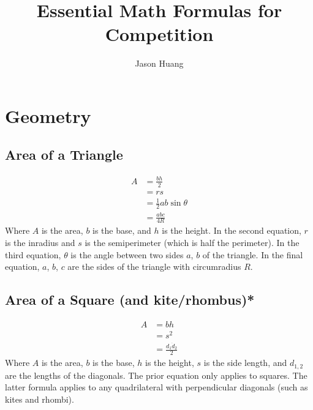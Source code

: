 \documentclass[]{scrartcl}
\title{Essential Math Formulas for Competition}
\author{Jason Huang}
\begin{document}
\maketitle

\newpage

\section{Geometry}
\subsection{Area of a Triangle}
\begin{align*}
A 	&= \frac{bh}{2} \\
	&= rs \\
	&= \frac{1}{2}ab\sin\theta \\
	&= \frac{abc}{4R}
\end{align*}
Where $ A $ is the area,
$ b $ is the base,
and $ h $ is the height.
In the second equation,
$ r $ is the inradius 
and $ s $ is the semiperimeter (which is half the perimeter).
In the third equation, 
$ \theta $ is the angle between two sides $ a $, $ b $ of the triangle.
In the final equation,
$ a $, $ b $, $ c $ are the sides of the triangle with circumradius $ R $.


\subsection{Area of a Square (and kite/rhombus)*}
\begin{align*}
A	&= bh \\
	&= s^2 \\
	&= \frac{d_1 \dot d_2}{2}
\end{align*}
Where $ A $ is the area,
$ b $ is the base,
$ h $ is the height,
$ s $ is the side length,
and $ d_{1,2} $ are the lengths of the diagonals.
The prior equation only applies to squares.
The latter formula applies to any quadrilateral with perpendicular diagonals (such as kites and rhombi).
\end{document}
